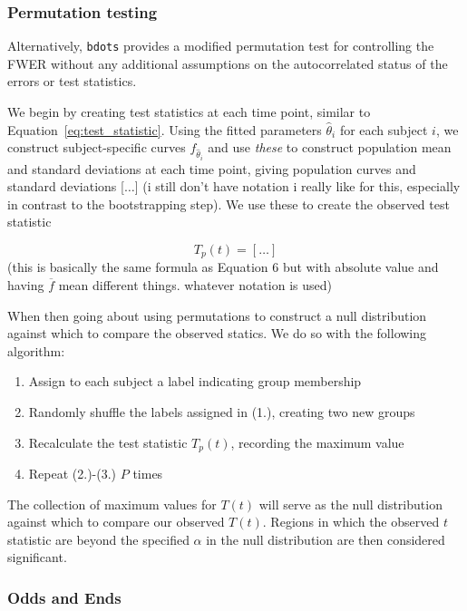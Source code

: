 \documentclass{article}
\newcommand{\xt}{\texttt}%
\begin{document}
\subsubsection{Permutation testing}

Alternatively, \xt{bdots} provides a modified permutation test for controlling the FWER without any additional assumptions on the autocorrelated status of the errors or test statistics. 

We begin by creating test statistics at each time point, similar to Equation~\ref{eq:test_statistic}. Using the fitted parameters $\hat{\theta}_i$ for each subject $i$, we construct subject-specific curves $f_{\hat{\theta}_i}$ and use \textit{these} to construct population mean and standard deviations at each time point, giving population curves and standard deviations [$\dots$] (i still don't have notation i really like for this, especially in contrast to the bootstrapping step). We use these to create the observed test statistic

\begin{equation}
T_p(t) = [\dots] 
\end{equation}
(this is basically the same formula as Equation 6 but with absolute value and having $\overline{f}$ mean different things. whatever notation is used)

When then going about using permutations to construct a null distribution against which to compare the observed statics. We do so with the following algorithm:

\begin{enumerate}
\item Assign to each subject a label indicating group membership
\item Randomly shuffle the labels assigned in (1.), creating two new groups 
\item Recalculate the test statistic $T_p(t)$, recording the maximum value
\item Repeat (2.)-(3.) $P$ times
\end{enumerate}

The collection of maximum values for $T(t)$ will serve as the null distribution against which to compare our observed $T(t)$. Regions in which the observed $t$ statistic are beyond the specified $\alpha$ in the null distribution are then considered significant.

\subsubsection{Odds and Ends}
\end{document}
